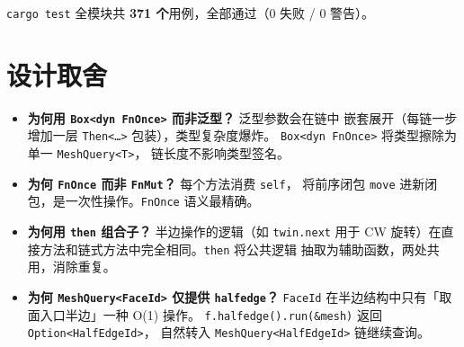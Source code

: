 \documentclass[11pt,a4paper]{article}
\begin{document}
\texttt{cargo test} 全模块共 \textbf{371 个}用例，全部通过（0 失败 / 0 警告）。

\section{设计取舍}

\begin{itemize}
  \item \textbf{为何用 \texttt{Box<dyn FnOnce>} 而非泛型？} 泛型参数会在链中
        嵌套展开（每链一步增加一层 \texttt{Then<\ldots>} 包装），类型复杂度爆炸。
        \texttt{Box<dyn FnOnce>} 将类型擦除为单一 \texttt{MeshQuery<T>}，
        链长度不影响类型签名。
  \item \textbf{为何 \texttt{FnOnce} 而非 \texttt{FnMut}？} 每个方法消费 \texttt{self}，
        将前序闭包 \texttt{move} 进新闭包，是一次性操作。\texttt{FnOnce} 语义最精确。
  \item \textbf{为何用 \texttt{then} 组合子？} 半边操作的逻辑（如 \texttt{twin.next}
        用于 CW 旋转）在直接方法和链式方法中完全相同。\texttt{then} 将公共逻辑
        抽取为辅助函数，两处共用，消除重复。
  \item \textbf{为何 \texttt{MeshQuery<FaceId>} 仅提供 \texttt{halfedge}？}
        \texttt{FaceId} 在半边结构中只有「取面入口半边」一种 O(1) 操作。
        \texttt{f.halfedge().run(\&mesh)} 返回 \texttt{Option<HalfEdgeId>}，
        自然转入 \texttt{MeshQuery<HalfEdgeId>} 链继续查询。
\end{itemize}
\end{document}
